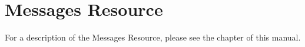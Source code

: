 



\section{Messages Resource}
\label{MessagesResource1}

For a description of the Messages Resource, please see the
 chapter of this
manual.
